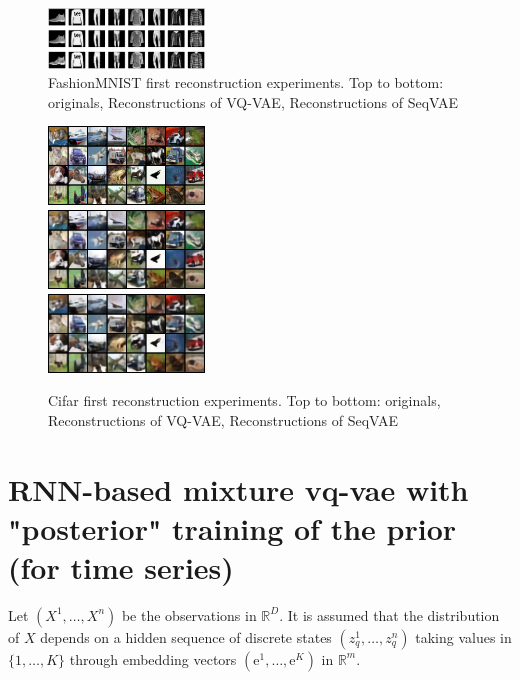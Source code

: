 \documentclass{article}
\newcommand{\rset}{\ensuremath{\mathbb{R}}}
\newcommand{\rme}{\mathrm{e}}
\begin{document}
\begin{figure}[htp]
    \begin{center}
    \includegraphics[width=0.37\textwidth]{images/seqvae3.png}
    \caption{FashionMNIST first reconstruction experiments. Top to bottom: originals, Reconstructions of VQ-VAE, Reconstructions of SeqVAE}
    \end{center}
\end{figure}

\begin{figure}[htp]
    \begin{center}
    \includegraphics[width=0.37\textwidth]{images/originals.png} \\
		\includegraphics[width=0.37\textwidth]{images/vqvae2.png} \\
		\includegraphics[width=0.37\textwidth]{images/seqvqvae2.png}
    \caption{Cifar first reconstruction experiments. Top to bottom: originals, Reconstructions of VQ-VAE, Reconstructions of SeqVAE}
    \end{center}
\end{figure}


\clearpage
\newpage

\section{RNN-based mixture vq-vae with "posterior" training of the prior (for time series)}
 Let $(X^1,\ldots,X^n)$ be the observations in $\rset^D$.  It is assumed that the distribution of $X$ depends on a hidden sequence of discrete states $(z_q^1,\ldots, z_q^n)$ taking values in $\{1,\ldots,K\}$ through  embedding vectors $(\rme^1,\ldots,\rme^K)$ in $\rset^m$.
\end{document}
